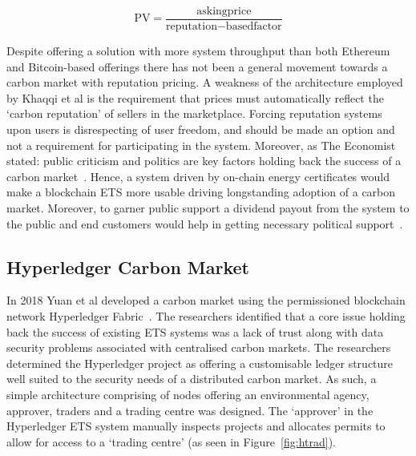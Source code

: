 \begin{equation}
    \text{PV} =
    \frac{\text{askingprice}}
    {\text{reputation} - \text{basedfactor}}
    \label{eqn:pv}
\end{equation}

Despite offering a solution with more
system throughput than both Ethereum and Bitcoin-based offerings
there has not been a general movement towards
a carbon market with reputation pricing. A weakness of the
architecture employed by Khaqqi et al is the requirement that
prices must automatically reflect the `carbon reputation' of
sellers in the marketplace. Forcing reputation systems
upon users is disrespecting of user freedom, and
should be made an option and not a requirement for
participating in the system. Moreover, as The Economist
stated: public criticism and politics are key factors holding
back the success of a carbon market~\cite{EconE}. Hence,
a system driven by on-chain energy certificates would make
a blockchain ETS more usable driving longstanding adoption of a
carbon market. Moreover, to garner public support a dividend
payout from the system to the public and end customers would help in
getting necessary political support~\cite{EconE}.

\subsection{Hyperledger Carbon Market}
In 2018 Yuan et al developed a carbon market using the
permissioned blockchain network Hyperledger Fabric~\cite{article}.
The researchers identified that a core issue holding back the
success of existing ETS systems was a lack of trust
along with data security problems associated with centralised carbon
markets.
The researchers determined the Hyperledger project as offering
a customisable ledger structure well suited to the security
needs of a distributed carbon market. As such, a simple
architecture comprising of nodes offering an environmental
agency, approver, traders and a trading centre was designed. The
`approver' in the Hyperledger ETS system manually inspects
projects and allocates permits to allow for access to a `trading
centre' (as seen in Figure~\ref{fig:htrad}).


